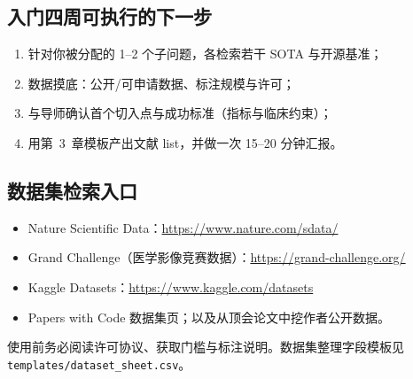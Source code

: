\subsection{入门四周可执行的下一步}
\begin{enumerate}
  \item 针对你被分配的 1--2 个子问题，各检索若干 SOTA 与开源基准；
  \item 数据摸底：公开/可申请数据、标注规模与许可；
  \item 与导师确认首个切入点与成功标准（指标与临床约束）；
  \item 用第~3~章模板产出文献 list，并做一次 15--20 分钟汇报。
\end{enumerate}

\subsection{数据集检索入口}
\begin{itemize}
  \item Nature Scientific Data：\url{https://www.nature.com/sdata/}
  \item Grand Challenge（医学影像竞赛数据）：\url{https://grand-challenge.org/}
  \item Kaggle Datasets：\url{https://www.kaggle.com/datasets}
  \item Papers with Code 数据集页；以及从顶会论文中挖作者公开数据。
\end{itemize}
使用前务必阅读许可协议、获取门槛与标注说明。数据集整理字段模板见 \texttt{templates/dataset\_sheet.csv}。
